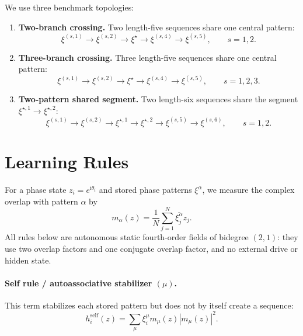 \documentclass[11pt]{article}
\begin{document}
We use three benchmark topologies:
\begin{enumerate}
    \item[(a)] \textbf{Two-branch crossing.}
    Two length-five sequences share one central pattern:
    \begin{equation}
        \xi^{(s,1)}
        \to
        \xi^{(s,2)}
        \to
        \xi^{\star}
        \to
        \xi^{(s,4)}
        \to
        \xi^{(s,5)},
        \qquad s=1,2 .
    \end{equation}

    \item[(b)] \textbf{Three-branch crossing.}
    Three length-five sequences share one central pattern:
    \begin{equation}
        \xi^{(s,1)}
        \to
        \xi^{(s,2)}
        \to
        \xi^{\star}
        \to
        \xi^{(s,4)}
        \to
        \xi^{(s,5)},
        \qquad s=1,2,3 .
    \end{equation}

    \item[(c)] \textbf{Two-pattern shared segment.}
    Two length-six sequences share the segment
    $\xi^{\star,1}\to\xi^{\star,2}$:
    \begin{equation}
        \xi^{(s,1)}
        \to
        \xi^{(s,2)}
        \to
        \xi^{\star,1}
        \to
        \xi^{\star,2}
        \to
        \xi^{(s,5)}
        \to
        \xi^{(s,6)},
        \qquad s=1,2 .
    \end{equation}
\end{enumerate}
\section{Learning Rules}

For a phase state $z_i=e^{\mathrm{i}\theta_i}$ and stored phase patterns
$\xi^\alpha$, we measure the complex overlap with pattern $\alpha$ by
\begin{equation}
m_\alpha(z)
=
\frac{1}{N}
\sum_{j=1}^N
\overline{\xi_j^\alpha}z_j .
\end{equation}
All rules below are autonomous static fourth-order fields of bidegree $(2,1)$:
they use two overlap factors and one conjugate overlap factor, and no external
drive or hidden state.

\paragraph{Self rule / autoassociative stabilizer $(\mu)$.}
This term stabilizes each stored pattern but does not by itself create a
sequence:
\begin{equation}
h_i^{\mathrm{self}}(z)
=
\sum_\mu
\xi_i^{\mu}
m_{\mu}(z)
\left|m_{\mu}(z)\right|^2 .
\end{equation}
\end{document}
